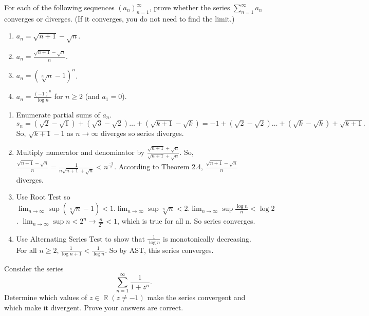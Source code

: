 \documentclass[12pt,letterpaper,boxed]{hmcpset}
\DeclareMathOperator{\R}{\mathbb{R}}
\begin{document}

\begin{problem}[Exercise 2.16]
For each of the following sequences $(a_n)_{n = 1}^{\infty}$, prove whether the series $\sum_{n =1}^{\infty}a_n$ converges or diverges. (If it converges, you do not need to find the limit.)
\begin{enumerate}
    \item $a_n = \sqrt{n + 1} - \sqrt{n}$.
    \item $a_n = \frac{\sqrt{n + 1} - \sqrt{n}}{n}$.
    \item $a_n = (\sqrt[n]{n} - 1)^{n}$.
    \item $a_n = \frac{(-1)^{n}}{\log{n}}$ for $n \ge 2$ (and $a_1 = 0$).
\end{enumerate}
\end{problem}

\begin{solution}
\begin{enumerate}
    \item Enumerate partial sums of $a_n$. $s_n=(\sqrt{2} - \sqrt{1}) + (\sqrt{3} - \sqrt{2}) \dots + (\sqrt{k + 1} - \sqrt{k}) = -1 + (\sqrt{2} - \sqrt{2}) \dots + (\sqrt{k} - \sqrt{k}) + \sqrt{k + 1}.$ So, $\sqrt{k + 1} - 1$ as $n\rightarrow\infty$ diverges so series diverges.
    \item Multiply numerator and denominator by $\frac{\sqrt{n + 1} + \sqrt{n}}{\sqrt{n + 1} + \sqrt{n}}$. So, $\frac{\sqrt{n + 1} - \sqrt{n}}{n} = \frac{1}{n\sqrt{n + 1} + \sqrt{n}} < n^{\frac{-3}{2}}$. According to Theorem 2.4, $\frac{\sqrt{n + 1} - \sqrt{n}}{n}$ diverges.
    \item Use Root Test so $\lim_{n \rightarrow\infty} \sup(\sqrt[n]{n} - 1) < 1. \lim_{n \rightarrow\infty} \sup \sqrt[n]{n} < 2. \lim_{n \rightarrow\infty} \sup \frac{\log{n}}{n} < \log{2}$. $\lim_{n \rightarrow\infty} \sup n < 2^{n} \rightarrow \frac{n}{2^{n}} < 1$, which is true for all  n. So series converges. 
    \item Use Alternating Series Test to show that $\frac{1}{\log{n}}$ is monotonically decreasing. For all $n \ge 2, \frac{1}{\log{n + 1}} < \frac{1}{\log{n}}$. So by AST, this series converges.
\end{enumerate}
\end{solution}

\begin{problem}[Exercise 2.17]
Consider the series $$\sum_{n=1}^{\infty} \frac{1}{1 + z^{n}}.$$ Determine which values of $z\in\R (z \neq -1)$ make the series convergent and which make it divergent. Prove your answers are correct.
\end{problem}
\end{document}
